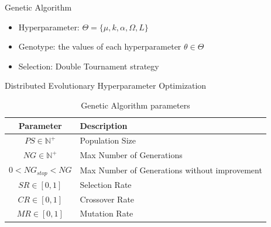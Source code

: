 \documentclass{beamer}
\begin{document}
\begin{frame}{Genetic Algorithm}
\linespread{2}
\begin{itemize}
    \item Hyperparameter: $\Theta = \{\mu,k,\alpha,\Omega,L\}$
    \item Genotype: the values of each hyperparameter $\theta \in \Theta$
    \item Selection: Double Tournament strategy 
\end{itemize}
\end{frame}

\begin{frame}{Distributed Evolutionary Hyperparameter Optimization}
\begin{table}[htb]
    \centering
    \begin{tabular}{|c|p{7cm}|} \hline
        \textbf{Parameter} & \textbf{Description}  \\ \hline
         $PS \in \mathbb{N}^+$ & Population Size \\ \hline
         $NG \in \mathbb{N}^+$ & Max Number of Generations \\ \hline 
         $0 < NG_{stop} < NG$ & Max Number of Generations without improvement \\ \hline 
         $SR \in [0,1]$ & Selection Rate \\ \hline 
         $CR \in [0,1]$ & Crossover Rate \\ \hline 
         $MR \in [0,1]$ & Mutation Rate \\ \hline 
    \end{tabular}
    \caption{Genetic Algorithm parameters}
    \label{tab:genetic_algoritm}
\end{table}
\end{frame}
\end{document}
